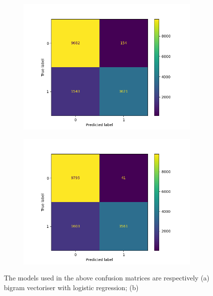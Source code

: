 \begin{figure}
\begin{subfigure}[b]{0.245\textwidth}
            \includegraphics[scale=0.35]{"../figs/fig_content_title/fig_ngram_3_DecisionTreeClassifier()__content_title.png"}
            \caption{}
        \end{subfigure}
        \begin{subfigure}[b]{0.245\textwidth}
            \centering
            \includegraphics[scale=0.35]{"../figs/fig_content_title/fig_ngram_3_SVC(kernel='linear')__content_title.png"}
            \subcaption{}
        \end{subfigure}
        \caption{The models used in the above confusion matrices are respectively (a) bigram vectoriser with logistic regression; (b)}
    \end{figure}
